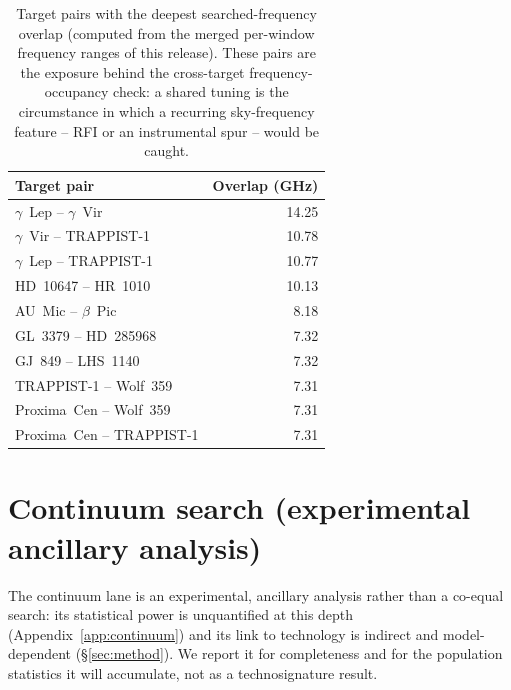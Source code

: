 \documentclass{openjournal}
\begin{document}
\begin{table}
\centering
\small
\caption{Target pairs with the deepest searched-frequency overlap
(computed from the merged per-window frequency ranges of this
release). These pairs are the exposure behind the cross-target
frequency-occupancy check: a shared tuning is the circumstance in
which a recurring sky-frequency feature -- RFI or an instrumental
spur -- would be caught.}
\label{tab:pairs}
\begin{tabular}{@{}lr@{}}
\hline
Target pair & Overlap (GHz) \\
\hline
$\gamma$~Lep -- $\gamma$~Vir & 14.25 \\
$\gamma$~Vir -- TRAPPIST-1 & 10.78 \\
$\gamma$~Lep -- TRAPPIST-1 & 10.77 \\
HD~10647 -- HR~1010 & 10.13 \\
AU~Mic -- $\beta$~Pic & 8.18 \\
GL~3379 -- HD~285968 & 7.32 \\
GJ~849 -- LHS~1140 & 7.32 \\
TRAPPIST-1 -- Wolf~359 & 7.31 \\
Proxima~Cen -- Wolf~359 & 7.31 \\
Proxima~Cen -- TRAPPIST-1 & 7.31 \\
\hline
\end{tabular}
\end{table}

\section{Continuum search (experimental ancillary analysis)}
\label{app:contsearch}

The continuum lane is an experimental, ancillary analysis rather than
a co-equal search: its statistical power is unquantified at this depth
(Appendix~\ref{app:continuum}) and its link to technology is indirect and
model-dependent (\S\ref{sec:method}). We report it for completeness
and for the population statistics it will accumulate, not as a
technosignature result.
\end{document}
